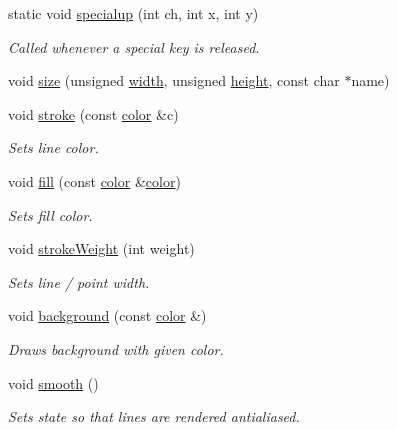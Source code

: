 \begin{DoxyCompactItemize}
static void \hyperlink{namespacecprocessing_af02bc302506ac700a3a297172dcb15d6}{specialup} (int ch, int x, int y)
\begin{DoxyCompactList}\small\item\em \-Called whenever a special key is released. \end{DoxyCompactList}\item 
void \hyperlink{namespacecprocessing_ab33eba8fec733b7b3a1a14f1191499bc}{size} (unsigned \hyperlink{namespacecprocessing_a7af937eb8772235def57fcadd10fc82a}{width}, unsigned \hyperlink{namespacecprocessing_ac392753eef02e2ad4ad84f5a076919be}{height}, const char $\ast$name)
\item 
void \hyperlink{namespacecprocessing_af815879b404059ab470b9c33355d084f}{stroke} (const \hyperlink{classcprocessing_1_1color}{color} \&c)
\begin{DoxyCompactList}\small\item\em \-Sets line color. \end{DoxyCompactList}\item 
void \hyperlink{namespacecprocessing_a0cdae921f6061ef2e6574ba2d3a08fe3}{fill} (const \hyperlink{classcprocessing_1_1color}{color} \&\hyperlink{classcprocessing_1_1color}{color})
\begin{DoxyCompactList}\small\item\em \-Sets fill color. \end{DoxyCompactList}\item 
void \hyperlink{namespacecprocessing_a80f508e91c571079b7632c808246e85f}{stroke\-Weight} (int weight)
\begin{DoxyCompactList}\small\item\em \-Sets line / point width. \end{DoxyCompactList}\item 
void \hyperlink{namespacecprocessing_ac8cb10897d638434fd395afe0da61e7e}{background} (const \hyperlink{classcprocessing_1_1color}{color} \&)
\begin{DoxyCompactList}\small\item\em \-Draws background with given color. \end{DoxyCompactList}\item 
void \hyperlink{namespacecprocessing_a3078c9359807ad49550d1d0961827f3d}{smooth} ()
\begin{DoxyCompactList}\small\item\em \-Sets state so that lines are rendered antialiased. \end{DoxyCompactList}\item 

\end{DoxyCompactItemize}
